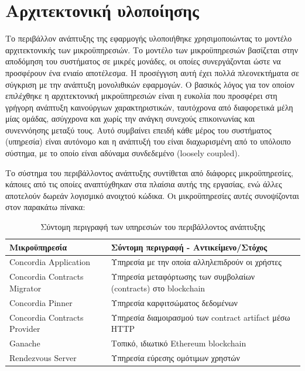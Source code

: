 \section{Αρχιτεκτονική υλοποίησης} \label{section:4-3-implementation-architecture}

Το περιβάλλον ανάπτυξης της εφαρμογής υλοποιήθηκε χρησιμοποιώντας το μοντέλο αρχιτεκτονικής των μικροϋπηρεσιών. Το μοντέλο των μικροϋπηρεσιών βασίζεται στην αποδόμηση του συστήματος σε μικρές μονάδες, οι οποίες συνεργάζονται ώστε να προσφέρουν ένα ενιαίο αποτέλεσμα. Η προσέγγιση αυτή έχει πολλά πλεονεκτήματα σε σύγκριση με την ανάπτυξη μονολιθικών εφαρμογών. %
Ο βασικός λόγος για τον οποίον επιλέχθηκε η αρχιτεκτονική μικροϋπηρεσιών είναι η ευκολία που προσφέρει στη γρήγορη ανάπτυξη καινούργιων χαρακτηριστικών, ταυτόχρονα από διαφορετικά μέλη μίας ομάδας, ασύγχρονα και χωρίς την ανάγκη συνεχούς επικοινωνίας και συνεννόησης μεταξύ τους. Αυτό συμβαίνει επειδή κάθε μέρος του συστήματος (υπηρεσία) είναι αυτόνομο και η ανάπτυξή του είναι διαχωρισμένη από το υπόλοιπο σύστημα, με το οποίο είναι αδύναμα συνδεδεμένο (loosely coupled).

Το σύστημα του περιβάλλοντος ανάπτυξης συντίθεται από διάφορες μικροϋπηρεσίες, κάποιες από τις οποίες αναπτύχθηκαν στα πλαίσια αυτής της εργασίας, ενώ άλλες αποτελούν δωρεάν λογισμικό ανοιχτού κώδικα. Οι μικροϋπηρεσίες αυτές συνοψίζονται στον παρακάτω πίνακα:

\begin{table}[H]
    \begin{center}
        \begin{tabularx}{\textwidth}{l X}
            \toprule
            \textbf{Μικροϋπηρεσία} & \textbf{Σύντομη περιγραφή - Αντικείμενο/Στόχος} \\
            \midrule
            Concordia Application        & Υπηρεσία με την οποία αλληλεπιδρούν οι χρήστες \\ [0.5ex]
            Concordia Contracts Migrator & Υπηρεσία μεταφόρτωσης των συμβολαίων (contracts) στο blockchain \\ [0.5ex]
            Concordia Pinner             & Υπηρεσία καρφιτσώματος δεδομένων \\ [0.5ex]
            Concordia Contracts Provider & Υπηρεσία διαμοιρασμού των contract artifact μέσω HTTP \\ [0.5ex]
            Ganache                      & Τοπικό, ιδιωτικό Ethereum blockchain \\ [0.5ex]
            Rendezvous Server            & Υπηρεσία εύρεσης ομότιμων χρηστών \\ [0.5ex]
            \bottomrule
        \end{tabularx}
    \end{center}
    \caption{Σύντομη περιγραφή των υπηρεσιών του περιβάλλοντος ανάπτυξης}
    \label{table:4-3-microservice-summary}
\end{table}

